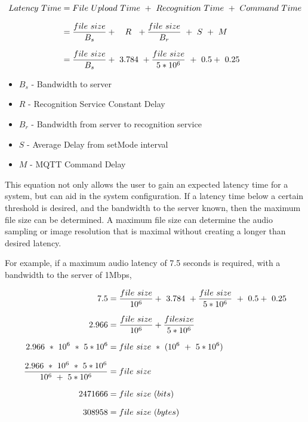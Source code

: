 \documentclass{article}
\begin{document}
\begin{equation*}
\setlength{\jot}{10pt}
\begin{split}
Latency\ Time 	&= File\ Upload\ Time\ +\ Recognition\ Time\ +\ Command\ Time \\
				&= \frac{file\ size}{B_s} +\ \ \ R\ \ + \frac{file\ size}{B_r}\ +\ S\  +\ M \\
				&= \frac{file\ size}{B_s} +\ 3.784\ + \frac{file\ size}{5*10^6}\ +\ 0.5 +\ 0.25 
\end{split}
\end{equation*}

\begin{itemize}
	\item $B_s$ - Bandwidth to server
	\item $R$ - Recognition Service Constant Delay
	\item $B_r$ - Bandwidth from server to recognition service
	\item $S$ - Average Delay from setMode interval
	\item $M$ - MQTT Command Delay
\end{itemize}

This equation not only allows the user to gain an expected latency time for a system, but can aid in the system configuration. If a latency time below a certain threshold is desired, and the bandwidth to the server known, then the maximum file size can be determined. A maximum file size can determine the audio sampling or image resolution that is maximal without creating a longer than desired latency.

For example, if a maximum audio latency of 7.5 seconds is required, with a bandwidth to the server of 1Mbps, 

\begin{equation*}
\setlength{\jot}{10pt}
\begin{split}
7.5 	&= \frac{file\ size}{10^6} +\ 3.784\ + \frac{file\ size}{5*10^6}\ +\ 0.5 +\ 0.25 \\
2.966 &= \frac{file\ size}{10^6} + \frac{file size}{5*10^6} \\
2.966\ *\ 10^6\ *\ 5*10^6 &= file\ size\ *\ (10^6\ +\ 5*10^6) \\
\frac{2.966\ *\ 10^6\ *\ 5*10^6}{10^6\ +\ 5*10^6 } &= file\ size \\
 2471666&= file\ size\ (bits) \\
 308958 &= file\ size\ (bytes)
\end{split}
\end{equation*}
\end{document}
